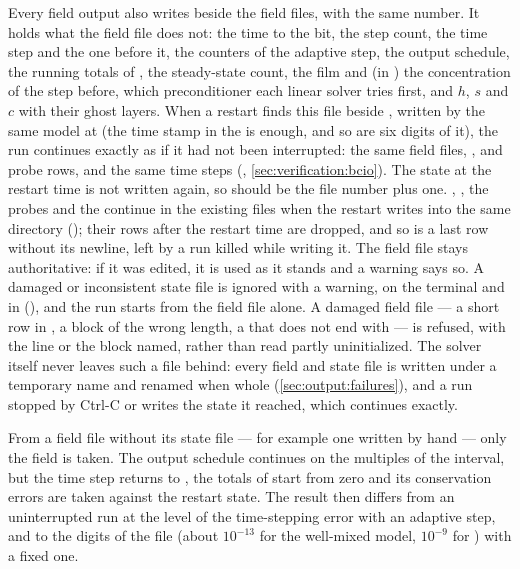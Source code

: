 Every field output also writes  beside the field files,
with the same number. It holds what the field file does not: the time to the
bit, the step count, the time step and the one before it, the counters of the
adaptive step, the output schedule, the running totals of
, the steady-state count, the film and (in ) the
concentration of the step before, which preconditioner each linear solver
tries first, and $h$, $s$ and $c$ with their ghost
layers. When a restart finds this file beside , written by the
same model at  (the time stamp in the  is
enough, and so are six digits of it), the run continues exactly as if it had not been interrupted: the
same field files, ,  and probe rows, and
the same time steps (, \cref{sec:verification:bcio}).
The state at the restart time is not written again, so 
should be the file number plus one. , ,
the probes and the  continue in the existing files when the
restart writes into the same directory (); their rows
after the restart time are dropped, and so is a last row without its
newline, left by a run killed while writing it. The field file stays
authoritative: if it was edited, it is used as it stands and a warning says
so. A damaged or inconsistent state file is ignored with a warning, on the
terminal and in  (),
and the run starts from the field file alone. A damaged field file --- a
short row in , a block of the wrong length, a 
that does not end with  --- is refused, with the line or the
block named, rather than read partly uninitialized. The solver itself never
leaves such a file behind: every field and state file is written under a
temporary name and renamed when whole (\cref{sec:output:failures}), and a run
stopped by Ctrl-C or  writes the state it reached, which
continues exactly.

From a field file without its state file --- for example one written by
hand --- only the field is taken. The output schedule continues on the
multiples of the interval, but the time step returns to , the
totals of  start from zero and its conservation errors are
taken against the restart state. The result then differs from an
uninterrupted run at the level of the time-stepping error with an adaptive
step, and to the digits of the file (about $10^{-13}$ for the well-mixed
model, $10^{-9}$ for ) with a fixed one.

